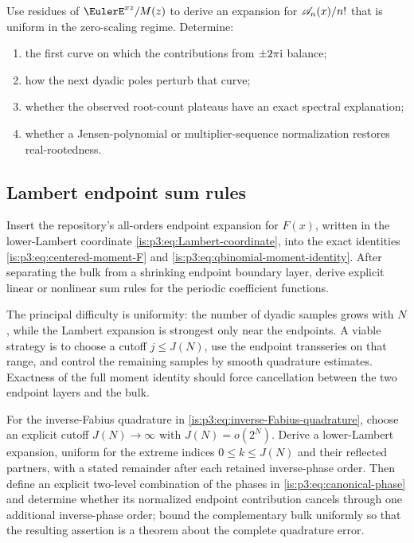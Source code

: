 \begin{problem}
\label{is:p3:prob:Appell-spectral-asymptotic}
Use residues of $\EulerE^{xz}/M(z)$ to derive an expansion for $\mathscr A_n(x)/n!$ that is uniform in the zero-scaling regime.  Determine:
\begin{enumerate}
\item the first curve on which the contributions from $\pm2\pi\mathrm i$ balance;
\item how the next dyadic poles perturb that curve;
\item whether the observed root-count plateaus have an exact spectral explanation;
\item whether a Jensen-polynomial or multiplier-sequence normalization restores real-rootedness.
\end{enumerate}
\end{problem}

\subsection{Lambert endpoint sum rules}

\begin{problem}
\label{is:p3:prob:Lambert-sum-rules}
Insert the repository's all-orders endpoint expansion for $F(x)$, written in the lower-Lambert coordinate \eqref{is:p3:eq:Lambert-coordinate}, into the exact identities \eqref{is:p3:eq:centered-moment-F} and \eqref{is:p3:eq:qbinomial-moment-identity}.  After separating the bulk from a shrinking endpoint boundary layer, derive explicit linear or nonlinear sum rules for the periodic coefficient functions.
\end{problem}

The principal difficulty is uniformity: the number of dyadic samples grows with $N$, while the Lambert expansion is strongest only near the endpoints.  A viable strategy is to choose a cutoff $j\le J(N)$, use the endpoint transseries on that range, and control the remaining samples by smooth quadrature estimates.  Exactness of the full moment identity should force cancellation between the two endpoint layers and the bulk.

\begin{problem}
\label{is:p3:prob:quantile-endpoint-alias}
For the inverse-Fabius quadrature in
\eqref{is:p3:eq:inverse-Fabius-quadrature}, choose an explicit cutoff
$J(N)\to\infty$ with $J(N)=o(2^N)$.  Derive a lower-Lambert expansion,
uniform for the extreme indices $0\le k\le J(N)$ and their reflected partners,
with a stated remainder after each retained inverse-phase order.  Then define
an explicit two-level combination of the phases in
\eqref{is:p3:eq:canonical-phase} and determine whether its normalized
endpoint contribution cancels through one additional inverse-phase order;
bound the complementary bulk uniformly so that the resulting assertion is a
theorem about the complete quadrature error.
\end{problem}


